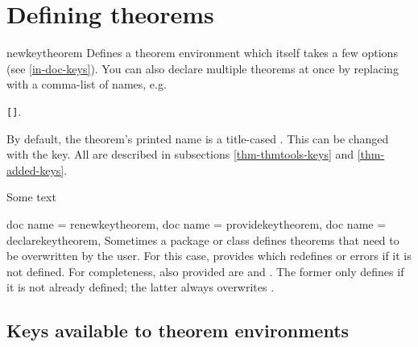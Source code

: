 \documentclass{ltxdoc}
\newcommand{\bracks}[1]{\texttt{[#1]}}
\newcommand{\ttbraces}[1]{\braces{\texttt{#1}}}
\begin{document}
\section{Defining theorems}

\begin{docCommand}{newkeytheorem}
  {}
Defines a theorem environment  which itself takes a few options (see \autoref{in-doc-keys}).
You can also declare multiple theorems at once by replacing  with a comma-list of names, e.g.
\begin{center}
\ttbraces{theorem,lemma,proposition}\bracks{}.
\end{center}

By default, the theorem's printed name is a title-cased .
This can be changed with the  key.
All  are described in subsections \ref{thm-thmtools-keys} and \ref{thm-added-keys}.

\begin{codepreamble}
\end{codepreamble}

\begin{keythmscode}[withpreamble]
\begin{theorem}
Some text
\end{theorem}
\end{keythmscode}

\end{docCommand}

\begin{docCommands}[
  doc parameter=\marg{env name}\oarg{options}
  ]
  {
    {doc name = renewkeytheorem},
    {doc name = providekeytheorem},
    {doc name = declarekeytheorem},
  }
Sometimes a package or class defines theorems that need to be overwritten by the user. For this case,  provides  which redefines  or errors if it is not defined. For completeness, also provided are  and . The former only defines  if it is not already defined; the latter always overwrites .
\end{docCommands}

\subsection{Keys available to theorem environments} \label{in-doc-keys}
\end{document}
